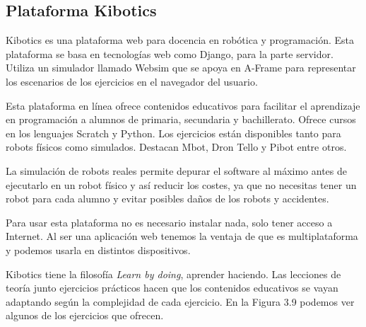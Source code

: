 \subsection{Plataforma Kibotics}

Kibotics es una plataforma web para docencia en robótica y programación. Esta plataforma se basa en tecnologías web como Django, para la parte servidor. Utiliza un simulador llamado Websim que se apoya en A-Frame para representar los escenarios de los ejercicios en el navegador del usuario.

Esta plataforma en línea ofrece contenidos educativos para facilitar el aprendizaje en programación a alumnos de primaria, secundaria y bachillerato. Ofrece cursos en los lenguajes Scratch y Python. Los ejercicios están disponibles tanto para robots físicos como simulados. Destacan Mbot, Dron Tello y Pibot entre otros.

La simulación de robots reales permite depurar el software al máximo antes de ejecutarlo en un robot físico y así reducir los costes, ya que no necesitas tener un robot para cada alumno y evitar  posibles daños de los robots y accidentes.

Para usar esta plataforma no es necesario instalar nada, solo tener acceso a Internet. Al ser una aplicación web tenemos la ventaja de que es multiplataforma y podemos usarla en distintos dispositivos.

Kibotics tiene la filosofía \textit{Learn by doing}, aprender haciendo. Las lecciones de teoría junto ejercicios prácticos hacen que los contenidos educativos se vayan adaptando según la complejidad de cada ejercicio. En la Figura 3.9 podemos ver algunos de los ejercicios que ofrecen.


